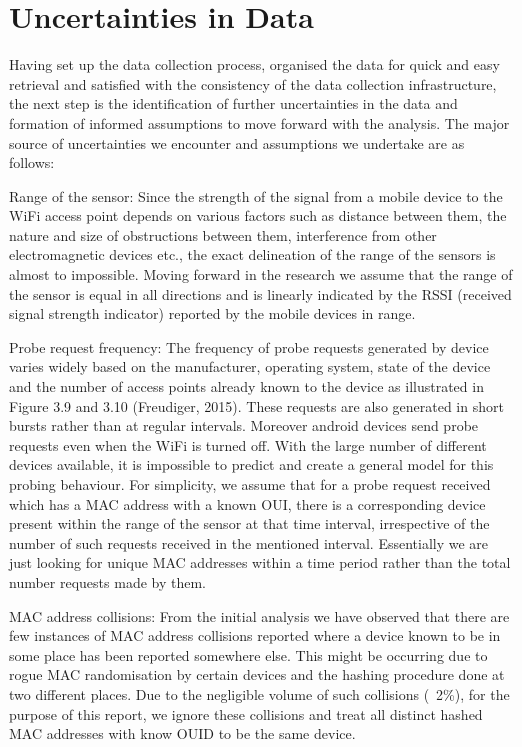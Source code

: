 \section{Uncertainties in Data}

Having set up the data collection process, organised the data for quick and easy retrieval and satisfied with the consistency of the data collection infrastructure, the next step is the identification of further uncertainties in the data and formation of informed assumptions to move forward with the analysis.
The major source of uncertainties we encounter and assumptions we undertake are as follows:

Range of the sensor: Since the strength of the signal from a mobile device to the WiFi access point depends on various factors such as distance between them, the nature and size of obstructions between them, interference from other electromagnetic devices etc., the exact delineation of the range of the sensors is almost to impossible.
Moving forward in the research we assume that the range of the sensor is equal in all directions and is linearly indicated by the RSSI (received signal strength indicator) reported by the mobile devices in range.

Probe request frequency: The frequency of probe requests generated by device varies widely based on the manufacturer, operating system, state of the device and the number of access points already known to the device as illustrated in Figure 3.9 and 3.10 (Freudiger, 2015).
These requests are also generated in short bursts rather than at regular intervals.
Moreover android devices send probe requests even when the WiFi is turned off.
With the large number of different devices available, it is impossible to predict and create a general model for this probing behaviour.
For simplicity, we assume that for a probe request received which has a MAC address with a known OUI, there is a corresponding device present within the range of the sensor at that time interval, irrespective of the number of such requests received in the mentioned interval.
Essentially we are just looking for unique MAC addresses within a time period rather than the total number requests made by them.

MAC address collisions: From the initial analysis we have observed that there are few instances of MAC address collisions reported where a device known to be in some place has been reported somewhere else.
This might be occurring due to rogue MAC randomisation by certain devices and the hashing procedure done at two different places.
Due to the negligible volume of such collisions (~2\%), for the purpose of this report, we ignore these collisions and treat all distinct hashed MAC addresses with know OUID to be the same device.
